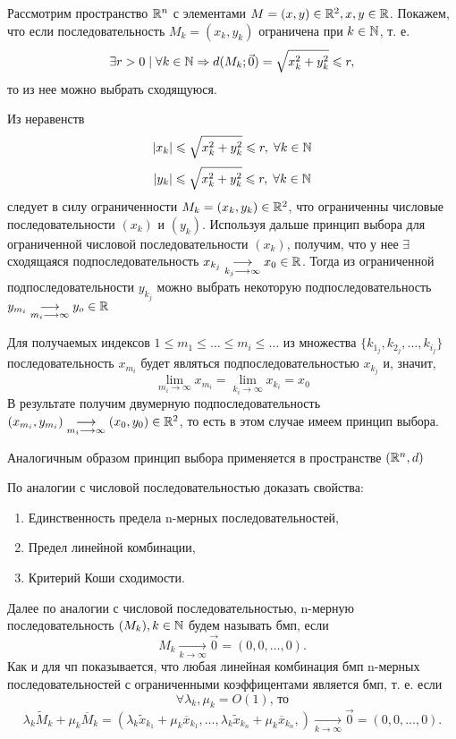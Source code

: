 \documentclass[../../main.tex]{subfiles}
\begin{document}
	\begin{exmp}
		Рассмотрим пространство $\mathbb{R}^n$ с элементами
		$M=(x,y) \in \mathbb{R}^2, x,y \in \mathbb{R}$. 
		Покажем, что если последовательность $M_k=(x_k,y_k)$ ограничена 
		при $k \in \mathbb{N}$, т. е.
		\[
		\exists r>0 \; | \; \forall k \in \mathbb{N} 
		\Rightarrow d(M_k; \vec0)=\sqrt{x^2_k+y^2_k} \leqslant r,
		\]
		то из нее можно выбрать сходящуюся.
		
		Из неравенств
		\[ 
		|x_k| \leqslant \sqrt{x^2_k+y^2_k}\leqslant r, \; \forall k \in \mathbb{N} 
		\]
		\[ 
		|y_k| \leqslant \sqrt{x^2_k+y^2_k}\leqslant r, \; \forall k \in \mathbb{N} 
		\]
		следует в силу ограниченности $M_k=(x_k,y_k) \in \mathbb{R}^2$, 
		что ограниченны числовые последовательности 
		$(x_k)$ и $(y_k)$. 
		Используя дальше принцип выбора для ограниченной 
		числовой последовательности $(x_k)$,
		получим, что у нее $\exists$ сходящаяся подпоследовательность
		$x_{k_j}\underset{k_j \longrightarrow \infty}
		{\longrightarrow}x_0 \in \mathbb{R}$.
		Тогда из ограниченной подпоследовательности $y_{k_j}$ 
		можно выбрать некоторую подпоследовательность
		$y_{m_i}\underset{m_i\longrightarrow \infty}
		{\longrightarrow}y_o \in \mathbb{R}$
		
		Для получаемых индексов $1 \leqslant m_1 \leqslant \dots 
		\leqslant m_i \leqslant \dots $ из множества
		$\{k_{1_j}, k_{2_j}, \dots, k_{i_j}\}$
		последовательность $ x_{m_i} $ будет являться 
		подпоследовательностью $ x_{k_j} $ и, значит, 
		\[  \lim_{m_i \to \infty}{x_{m_i}}= 
		\lim_{k_i \to \infty}{x_{k_i}}=  x_0\]
		В результате получим двумерную подпоследовательность 
		$(x_{m_i}, y_{m_i}) \underset{m_i\longrightarrow \infty}
		{\longrightarrow} (x_0, y_0) \in \mathbb{R}^2$,
		то есть в этом случае имеем принцип выбора.
		
		Аналогичным образом принцип выбора применяется в пространстве $(\mathbb{R}^n, d)$
	\end{exmp}

	\begin{exc}
		По аналогии с числовой последовательностью
		доказать свойства:
		\begin{enumerate}
			\item Единственность  предела n-мерных последовательностей,
			\item Предел линейной комбинации,
			\item Критерий Коши сходимости.
		\end{enumerate}
	\end{exc}

	Далее по аналогии с числовой последовательностью, 
	n-мерную последовательность $(M_k),  k \in \mathbb{N} $
	будем называть бмп, если
	\[
		M_k \underset{k \longrightarrow \infty}
		{\longrightarrow}\vec{0} = (0,0,\dots,0).
	\]
	Как и для чп показывается, что любая линейная 
	комбинация бмп n-мерных последовательностей с 
	ограниченными коэффицентами является бмп, т. е. если
	\[
		\forall \lambda_k, \mu_{k} = O(1) \text{, то}
	\] 
	\[
		\lambda_k \widetilde{M}_k + \mu_k \overline{M}_k =
		(\lambda_k \widetilde{x}_{k_1} + \mu_k \overline{x}_{k_1}, 
		\dots,
		\lambda_k \widetilde{x}_{k_n} + \mu_k \overline{x}_{k_n},
		)
		\underset{k \longrightarrow \infty}{\longrightarrow}
		\vec{0} = (0,0,\dots,0).
	\]
\end{document}
